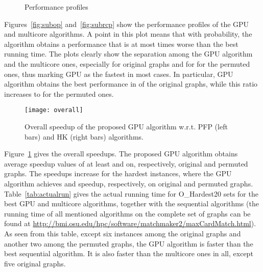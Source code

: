 \documentclass[11pt,a4paper]{article}
\newcommand{\supplementary} {\url{http://bmi.osu.edu/hpc/software/matchmaker2/maxCardMatch.html}}
\begin{document}
\begin{figure} [!htb]
\vspace*{-1em}
\caption{Performance profiles}

\end{figure}


Figures~\ref{fig:subop} and~\ref{fig:subrcp} show the performance profiles of 
the GPU and multicore algorithms. A point  in this plot means that with  probability, 
the algorithm obtains a performance that is at most  times worse than the best 
running time. The plots clearly show the separation among the GPU algorithm and the multicore ones, especially for original graphs and for  for the permuted ones, thus marking GPU as the fastest in most cases.
In particular, GPU algorithm obtains the 
best performance in  of the original graphs, while this ratio increases to  for the permuted 
ones. 



\begin{figure} [!htb]
\center
\texttt{[image: overall]}
\vspace*{-2ex}
\caption{Overall speedup of the proposed GPU algorithm w.r.t. PFP (left bars) and HK (right bars) algorithms. 
}

 \label{fig:overallspeedup}
\end{figure}


Figure~\ref{fig:overallspeedup} gives the overall speedups. The proposed GPU
algorithm obtains average speedup values of at least  and  on, respectively, original and permuted graphs.
The speedups increase for the hardest instances, where the GPU algorithm achieves  and  speedup, respectively, on original and permuted graphs. Table~\ref{tab:actualrun}
gives the actual running time for O\_Hardest20 sets for the best GPU and multicore algorithms, 
together with the sequential algorithms (the running time of all mentioned algorithms on 
the complete set of graphs can be found at \supplementary).
As seen from this table, except six instances among the original graphs and another two among the permuted graphs, the GPU algorithm is faster than the best sequential algorithm. It is also faster than the multicore ones in all, except five original graphs. 
\end{document}

